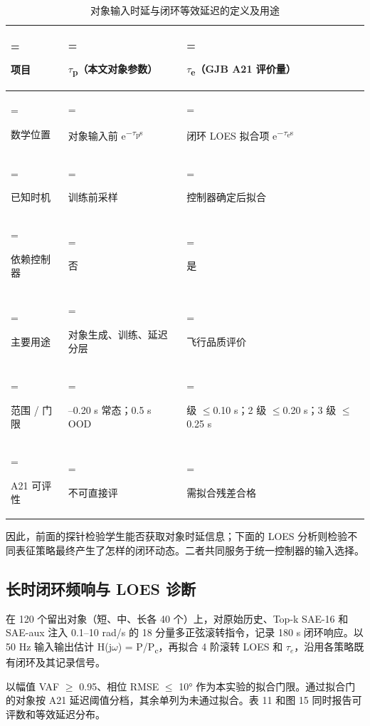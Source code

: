 \documentclass[UTF8,a4paper,11pt,fontset=fandol,scheme=plain]{ctexart}
\begin{document}
\begin{table}[!htbp]\centering
\caption{对象输入时延与闭环等效延迟的定义及用途}
\small\setlength{\tabcolsep}{4pt}\renewcommand{\arraystretch}{1.18}
\begin{tabularx}{\linewidth}{>{\hsize=1\hsize\linewidth=\hsize\raggedright\arraybackslash}X>{\hsize=1\hsize\linewidth=\hsize\raggedright\arraybackslash}X>{\hsize=1\hsize\linewidth=\hsize\raggedright\arraybackslash}X}\toprule
项目 & \ensuremath{\tau}\textsubscript{p}（本文对象参数） & \ensuremath{\tau}\textsubscript{e}（GJB A21 评价量） \\
\midrule
数学位置 & 对象输入前 e\textsuperscript{\ensuremath{-}\ensuremath{\tau}\textsubscript{p}s} & 闭环 LOES 拟合项 e\textsuperscript{\ensuremath{-}\ensuremath{\tau}\textsubscript{e}s} \\
已知时机 & 训练前采样 & 控制器确定后拟合 \\
依赖控制器 & 否 & 是 \\
主要用途 & 对象生成、训练、延迟分层 & 飞行品质评价 \\
范围 / 门限 & 0.001–0.20 s 常态；0.5 s OOD & 1 级 \ensuremath{\le}0.10 s；2 级 \ensuremath{\le}0.20 s；3 级 \ensuremath{\le}0.25 s \\
A21 可评性 & 不可直接评 & 需拟合残差合格 \\
\bottomrule\end{tabularx}\end{table}
因此，前面的探针检验学生能否获取对象时延信息；下面的 LOES 分析则检验不同表征策略最终产生了怎样的闭环动态。二者共同服务于统一控制器的输入选择。

\subsection{长时闭环频响与 LOES 诊断}
\hypertarget{s615}{}\label{s615}
在 120 个留出对象（短、中、长各 40 个）上，对原始历史、Top-k SAE-16 和 SAE-aux 注入 0.1–10 rad/s 的 18 分量多正弦滚转指令，记录 180 s 闭环响应。以 50 Hz 输入输出估计 H(j\ensuremath{\omega}) = P/P\textsubscript{c}，再拟合 4 阶滚转 LOES 和 \(\tau_{e}\)，沿用各策略既有闭环及其记录信号。

以幅值 VAF \ensuremath{\ge} 0.95、相位 RMSE \ensuremath{\le} 10° 作为本实验的拟合门限。通过拟合门的对象按 A21 延迟阈值分档，其余单列为未通过拟合。表 11 和图 15 同时报告可评数和等效延迟分布。
\end{document}
